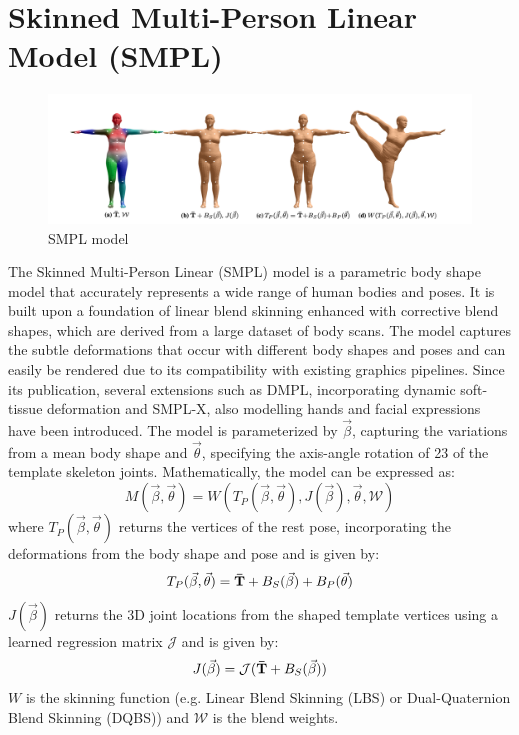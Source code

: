 \section{Skinned Multi-Person Linear Model (SMPL)}
\begin{figure}[h]
    \centering
    \includegraphics[width=\linewidth]{figures/smpl.png}
    \caption{SMPL model}
\end{figure}
The Skinned Multi-Person Linear (SMPL) model is a parametric body shape model that accurately represents a wide range of human bodies and poses. It is built upon a foundation of linear blend skinning enhanced with corrective blend shapes, which are derived from a large dataset of body scans. The model captures the subtle deformations that occur with different body shapes and poses and can easily be rendered due to its compatibility with existing graphics pipelines. Since its publication, several extensions such as DMPL, incorporating dynamic soft-tissue deformation and SMPL-X, also modelling hands and facial expressions have been introduced. The model is parameterized by $\vec{\beta}$, capturing the variations from a mean body shape and $\vec{\theta}$, specifying the axis-angle rotation of 23 of the template skeleton joints. Mathematically, the model can be expressed as:
\begin{equation}
    M(\vec{\beta}, \vec{\theta}) = W(T_P(\vec{\beta}, \vec{\theta}), J(\vec{\beta}), \vec{\theta}, \mathcal{W})
\end{equation}
where $T_P(\vec{\beta}, \vec{\theta})$ returns the vertices of the rest pose, incorporating the deformations from the body shape and pose and is given by:
\begin{equation}
    T_P(\vec{\beta}, \vec{\theta}) = \boldsymbol{\mathbf{\bar{T}}} + B_S(\vec{\beta}) + B_P(\vec{\theta})
\end{equation}
$J(\vec{\beta})$ returns the 3D joint locations from the shaped template vertices using a learned regression matrix $\mathcal{J}$ and is given by:
\begin{equation}
    J(\vec{\beta}) = \mathcal{J}(\boldsymbol{\mathbf{\bar{T}}} + B_S(\vec{\beta}))
\end{equation}
$W$ is the skinning function (e.g. Linear Blend Skinning (LBS) or Dual-Quaternion Blend Skinning (DQBS)) and $\mathcal{W}$ is the blend weights. 



